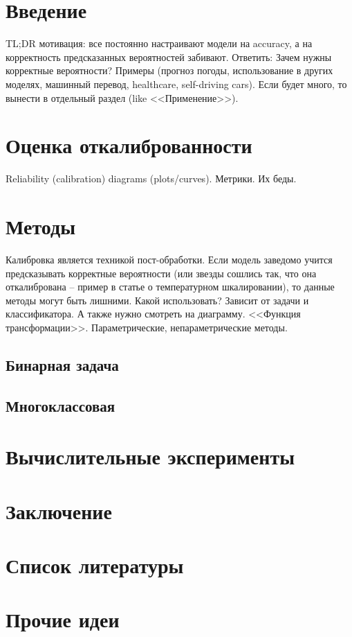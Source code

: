 \documentclass[12pt]{article}
\begin{document}
\section{Введение}
TL;DR мотивация: все постоянно настраивают модели на accuracy, а на корректность предсказанных вероятностей забивают. Ответить: Зачем нужны корректные вероятности? Примеры (прогноз погоды, использование в других моделях, машинный перевод, healthcare, self-driving cars). Если будет много, то вынести в отдельный раздел (like <<Применение>>).
\section{Оценка откалиброванности}
Reliability (calibration) diagrams (plots/curves). Метрики. Их беды.
\section{Методы}
Калибровка является техникой пост-обработки. Если модель заведомо учится предсказывать корректные вероятности (или звезды сошлись так, что она откалибрована -- пример в статье о температурном шкалировании), то данные методы могут быть лишними. Какой использовать? Зависит от задачи и классификатора. А также нужно смотреть на диаграмму.
<<Функция трансформации>>. Параметрические, непараметрические методы. 
\subsection{Бинарная задача}
\subsection{Многоклассовая}
\section{Вычислительные эксперименты}
\section{Заключение}
\section{Список литературы}
\section{Прочие идеи}
\end{document}
